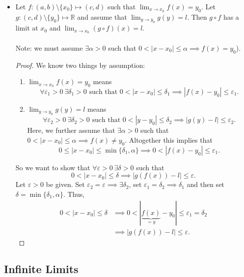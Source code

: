 \documentclass{article}
\newcommand{\R}{\mathbb{R}}
\newcommand{\?}{\stackrel{?}{=}}
\theoremstyle{definition} %
\begin{document}
\begin{itemize}
    \item[]
    \begin{lemma}
        Let $f: (a, b) \setminus \{x_0\} \mapsto (c, d)$ such that $\lim_{x \to x_0} f(x) = y_0$. Let $g: (c, d) \setminus \{y_0\} \mapsto \R$ and assume that $\lim_{y \to y_0} g(y) = l$. Then $g \circ f$ has a limit at $x_0$ and $\lim_{x \to x_0} (g \circ f)(x) = l$. \\\\
        Note: we must assume $\exists \alpha > 0$ such that $0 < |x - x_0| \leq \alpha \implies f(x) = y_0$).
    \end{lemma}
    \begin{proof}
        We know two things by assumption:
        \begin{enumerate}[label=(\arabic*)]
            \item $\lim_{x \to x_0} f(x) = y_0$ means
            $$\forall \varepsilon_1 > 0 \ \exists \delta_1 > 0 \text{ such that } 0 < |x - x_0| \leq \delta_1 \implies |f(x) - y_0| \leq \varepsilon_1.$$
            \item $\lim_{y \to y_0} g(y) = l$ means
            $$\forall \varepsilon_2 > 0 \ \exists \delta_2 > 0 \text{ such that } 0 < |y - y_0| \leq \delta_2 \implies |g(y) - l| \leq \varepsilon_2.$$
            Here, we further assume that $\exists \alpha > 0$ such that $0 < |x - x_0| \leq \alpha \implies f(x) \neq y_0$. Altogether this implies that
            $$0 \leq |x - x_0| \leq \min\{\delta_1, \alpha\} \implies 0 < |f(x) - y_0| \leq \varepsilon_1.$$
        \end{enumerate}
        So we want to show that $\forall \varepsilon > 0 \ \exists \delta > 0$ such that
        $$0 < |x - x_0| \leq \delta \implies |g(f(x)) - l| \leq \varepsilon.$$
        Let $\varepsilon > 0$ be given. Set $\varepsilon_2 = \varepsilon \implies \exists \delta_2$, set $\varepsilon_1 = \delta_2 \implies \delta_1$ and then set $\delta = \min\{\delta_1, \alpha\}$. Thus, 
        \begin{align*}
            0 < |x - x_0| \leq \delta &\implies 0 < |\underbrace{f(x)}_{= y} - y_0| \leq \varepsilon_1 = \delta_2 \\
            &\implies |g(f(x)) - l| \leq \varepsilon.
        \end{align*}
    \end{proof}
\end{itemize}

\subsection{Infinite Limits}
\end{document}
